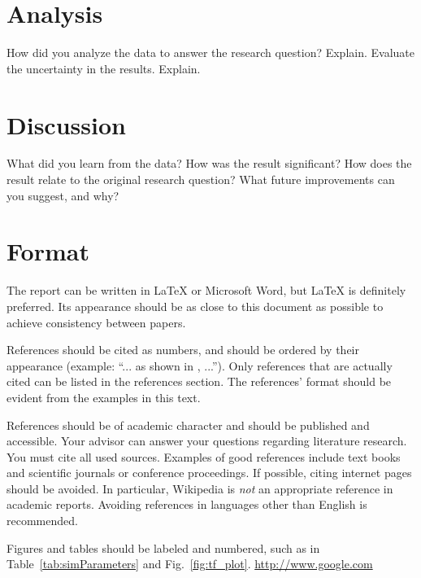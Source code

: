 \documentclass[journal, a4paper]{IEEEtran}
\begin{document}
\section{Analysis}
	How did you analyze the data to answer the research question? Explain. Evaluate the uncertainty in the results. Explain.

\section{Discussion}
	What did you learn from the data? How was the result significant? How does the result relate to the original research question? What 
    future improvements can you suggest, and why?
    
\section{Format}
	The report can be written in \LaTeX{} or Microsoft Word, but \LaTeX{} is definitely preferred.
	Its appearance should be as close to this document as possible to achieve consistency between papers.

	References should be cited as numbers, and should be ordered by their appearance (example: ``... as shown in \cite{HOP96}, ...'').
	Only references that are actually cited can be listed in the references section.
	The references' format should be evident from the examples in this text.

	References should be of academic character and should be published and accessible.
	Your advisor can answer your questions regarding literature research.
	You must cite all used sources.
	Examples of good references include text books and scientific journals or conference proceedings.
	If possible, citing internet pages should be avoided. In particular, Wikipedia is \emph{not} an appropriate reference in academic reports.
	Avoiding references in languages other than English is recommended.

	Figures and tables should be labeled and numbered, such as in Table~\ref{tab:simParameters} and Fig.~\ref{fig:tf_plot}. \url{http://www.google.com}
\end{document}
